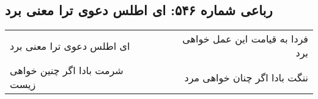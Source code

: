 \begin{center}
\section*{رباعی شماره ۵۴۶: ای اطلس دعوی ترا معنی برد}
\label{sec:0546}
\begin{longtable}{l p{0.5cm} r}
ای اطلس دعوی ترا معنی برد
&&
فردا به قیامت این عمل خواهی برد
\\
شرمت بادا اگر چنین خواهی زیست
&&
ننگت بادا اگر چنان خواهی مرد
\\
\end{longtable}
\end{center}
